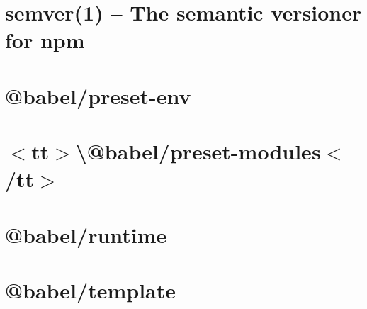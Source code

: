 \documentclass[twoside]{book}
\newcommand{\+}{\discretionary{\mbox{\scriptsize$\hookleftarrow$}}{}{}}
\begin{document}
\chapter{semver(1) -- The semantic versioner for npm}
\label{md__c___users_vaishnavi_jadhav__desktop__developer_code_mean_stack_example_client_node_modules__a6a329a620113ecd56363653e626f7f5}

\chapter{@babel/preset-\/env}
\label{md__c___users_vaishnavi_jadhav__desktop__developer_code_mean_stack_example_client_node_modules__babel_preset_env__r_e_a_d_m_e}

\chapter{\texorpdfstring{$<$}{<}tt\texorpdfstring{$>$}{>}\textbackslash{}@babel/preset-\/modules\texorpdfstring{$<$}{<}/tt\texorpdfstring{$>$}{>}}
\label{md__c___users_vaishnavi_jadhav__desktop__developer_code_mean_stack_example_client_node_modules__de8c03802d0ea7536d6b0b66b2497593}

\chapter{@babel/runtime}
\label{md__c___users_vaishnavi_jadhav__desktop__developer_code_mean_stack_example_client_node_modules__babel_runtime__r_e_a_d_m_e}

\chapter{@babel/template}
\label{md__c___users_vaishnavi_jadhav__desktop__developer_code_mean_stack_example_client_node_modules__babel_template__r_e_a_d_m_e}

\end{document}
